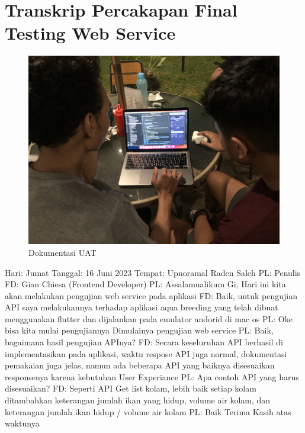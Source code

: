 
\section {Transkrip Percakapan Final Testing Web Service}
\begin{figure}[H]
	\centering
	\includegraphics[width=1\textwidth]{gambar/img_testing_webservice.JPG}
	\caption{Dokumentasi UAT}
	\label{fig:img_uat}
\end{figure}
\begin{flushleft}
Hari: Jumat
\linebreak
Tanggal: 16 Juni 2023
\linebreak
Tempat: Upnoramal Raden Saleh
\linebreak
PL: Penulis
\linebreak
FD: Gian Chiesa (Frontend Developer)
\linebreak
\linebreak
PL: Assalamualikum Gi, Hari ini kita akan melakukan pengujian web service pada aplikasi
\linebreak
FD: Baik, untuk pengujian API saya melakukannya terhadap aplikasi aqua breeding yang telah dibuat menggunakan flutter dan dijalankan pada emulator andorid di mac os
\linebreak
PL: Oke bisa kita mulai pengujiannya
\linebreak
Dimulainya pengujian web service
\linebreak
PL: Baik, bagaimana hasil pengujian APInya?
\linebreak
FD: Secara keseluruhan API berhasil di implementasikan pada aplikasi, waktu respose API juga normal, dokumentasi pemakaian juga jelas, namun ada beberapa API yang baiknya disesuaikan responsenya karena kebutuhan User Experiance
\linebreak
PL: Apa contoh API yang harus disesuaikan?
\linebreak
FD: Seperti API Get list kolam, lebih baik setiap kolam ditambahkan keterangan jumlah ikan yang hidup, volume air kolam, dan keterangan jumlah ikan hidup / volume air kolam
PL: Baik Terima Kasih atas waktunya
\end{flushleft}